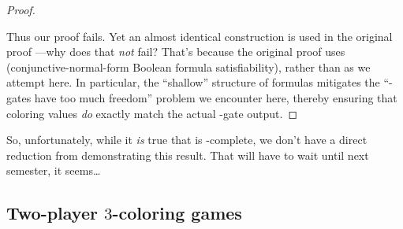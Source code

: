 \begin{aside}
\begin{proof}
\begin{center}
\begin{tikzpicture}
    \end{tikzpicture}
  \end{center}

  Thus our proof fails.  Yet an almost identical construction is used in the
  original proof \parencite{karp.np,potapov.3col}---why does that \emph{not}
  fail?  That's because the original proof uses 
  (conjunctive-normal-form Boolean formula satisfiability), rather than \CSAT{}
  as we attempt here.  In particular, the ``shallow'' structure of
   formulas mitigates the ``\OR-gates have too much freedom''
  problem we encounter here, thereby ensuring that coloring values \emph{do}
  exactly match the actual \OR-gate output.

\end{proof}
\end{aside}

So, unfortunately, while it \emph{is} true that  is \NP-complete,
we don't have a direct reduction from \CSAT{} demonstrating this result.  That
will have to wait until next semester, it seems\dots

\subsection{Two-player \(3\)-coloring games}

